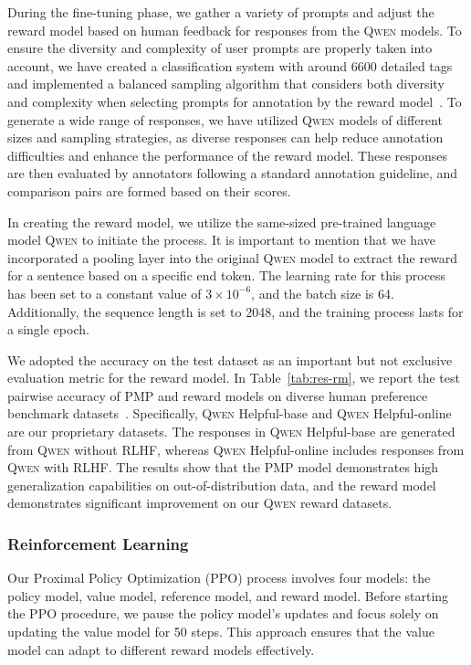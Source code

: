 During the fine-tuning phase, we gather a variety of prompts and adjust the reward model based on human feedback for responses from the \textsc{Qwen} models. To ensure the diversity and complexity of user prompts are properly taken into account, we have created a classification system with around \num{6600} detailed tags and implemented a balanced sampling algorithm that considers both diversity and complexity when selecting prompts for annotation by the reward model~\citep{instag}. To generate a wide range of responses, we have utilized \textsc{Qwen} models of different sizes and sampling strategies, as diverse responses can help reduce annotation difficulties and enhance the performance of the reward model. These responses are then evaluated by annotators following a standard annotation guideline, and comparison pairs are formed based on their scores. 

In creating the reward model, we utilize the same-sized pre-trained language model \textsc{Qwen} to initiate the process. It is important to mention that we have incorporated a pooling layer into the original \textsc{Qwen} model to extract the reward for a sentence based on a specific end token. The learning rate for this process has been set to a constant value of $3 \times 10^{-6}$,  and the batch size is \num{64}. Additionally, the sequence length is set to \num{2048}, and the training process lasts for a single epoch.

We adopted the accuracy on the test dataset as an important but not exclusive evaluation metric for the reward model. In Table~\ref{tab:res-rm}, we report the test pairwise accuracy of PMP and reward models on diverse human preference benchmark datasets~\citep{PMP,learn-summary, pmlr-v162-ethayarajh22a, lightman2023lets}. Specifically, \textsc{Qwen} Helpful-base and \textsc{Qwen} Helpful-online are our proprietary datasets. The responses in \textsc{Qwen} Helpful-base are generated from \textsc{Qwen} without RLHF, whereas \textsc{Qwen} Helpful-online includes responses from \textsc{Qwen} with RLHF. The results show that the PMP model demonstrates high generalization capabilities on out-of-distribution data, and the reward model demonstrates significant improvement on our \textsc{Qwen} reward datasets.

\subsubsection{Reinforcement Learning}

Our Proximal Policy Optimization (PPO) process involves four models: the policy model, value model, reference model, and reward model. Before starting the PPO procedure, we pause the policy model's updates and focus solely on updating the value model for \num{50} steps. This approach ensures that the value model can adapt to different reward models effectively.

